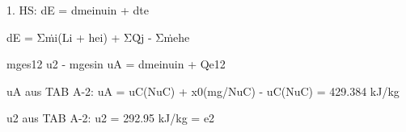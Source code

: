 1. HS: dE = dmeinuin + dte

dE = Σṁi(Li + hei) + ΣQ̇j - Σṁehe

mges12 u2 - mgesin uA = dmeinuin + Qe12

uA aus TAB A-2: uA = uC(NuC) + x0(mg/NuC) - uC(NuC) = 429.384 kJ/kg

u2 aus TAB A-2: u2 = 292.95 kJ/kg = e2